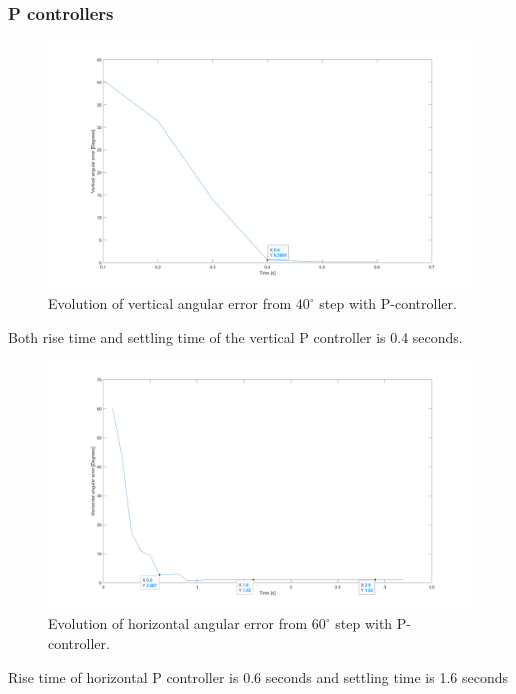 \subsubsection{P controllers}
\begin{figure}[H]
\centering
\includegraphics[width=\textwidth]{assets/Vertical_P_controller.png}
\caption{Evolution of vertical angular error from \(40^{\circ}\) step with P-controller.}
\label{vert_P}
\end{figure}
Both rise time and settling time of the vertical P controller is 0.4 seconds.
\begin{figure}[H]
\centering
\includegraphics[width=\textwidth]{assets/Horizontal_P_controller.png}
\caption{Evolution of horizontal angular error from \(60^{\circ}\) step with P-controller.}
\label{vert_P}
\end{figure}
Rise time of horizontal P controller is 0.6 seconds and settling time is 1.6 seconds

